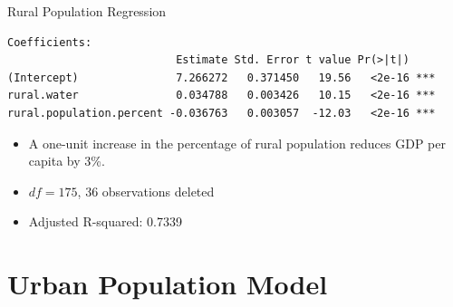 \documentclass{beamer}
\begin{document}
\begin{frame}[fragile]{{\sc Rural Population} Regression}
\small
\begin{verbatim}
Coefficients:
                          Estimate Std. Error t value Pr(>|t|)    
(Intercept)               7.266272   0.371450   19.56   <2e-16 ***
rural.water               0.034788   0.003426   10.15   <2e-16 ***
rural.population.percent -0.036763   0.003057  -12.03   <2e-16 ***
\end{verbatim}
\begin{itemize}
\item A one-unit increase in the percentage of rural population reduces GDP per capita by 3\%.
\item $df = 175$, 36 observations deleted 
\item Adjusted R-squared:  0.7339
\end{itemize}
\end{frame}



\section{Urban Population Model}
\end{document}
